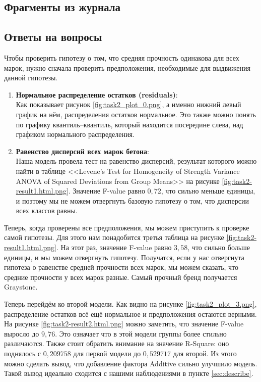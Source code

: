 \documentclass[12pt,a4paper]{article}
\begin{document}
  \subsection{Фрагменты из журнала}

  \subsection{Ответы на вопросы}
  \label{sec:model}
  Чтобы проверить гипотезу о том, что средняя прочность одинакова для всех марок, нужно сначала проверить предположения,
  необходимые для выдвижения данной гипотезы.
  \begin{enumerate}
    \item \textbf{Нормальное распределение остатков (residuals)}: \\
      Как показывает рисунок \ref{fig:task2_plot_0.png}, а именно нижний левый график на нём, распределения остатков нормальное.
      Это также можно понять по графику квантиль--квантиль, который находится посередине слева, над графиком нормального распределения.
    \item \textbf{Равенство дисперсий всех марок бетона}: \\
      Наша модель провела тест на равенство дисперсий, результат которого можно найти в таблице <<Levene's Test for Homogeneity of Strength Variance ANOVA of Squared Deviations from Group Means>> на рисунке \ref{fig:task2-result1.html.png}.
      Значение F-value равно $0,72$, что сильно меньше единицы, и поэтому мы не можем отвергнуть базовую гипотезу о том,
      что дисперсии всех классов равны.
  \end{enumerate}
  Теперь, когда проверены все предположения, мы можем приступить к проверке самой гипотезы.
  Для этого нам понадобится третья таблица на рисунке \ref{fig:task2-result1.html.png}.
  На этот раз, значение F-value равно $3,58$, что сильно больше единицы, и мы можем отвергнуть гипотезу.
  Получатся, если у нас отвергнута гипотеза о равенстве средней прочности всех марок,
  мы можем сказать, что средние прочности у всех марок разные.
  Самый прочный бренд получается Graystone.

  Теперь перейдём ко второй модели.
  Как видно на рисунке \ref{fig:task2_plot_3.png}, распределение остатков всё ещё нормальное и предположения остаются верными.
  На рисунке \ref{fig:task2-result2.html.png} можно заметить, что значение F-value выросло до $9,76$.
  Это означает что в этой модели группы более стильно различаются.
  Также стоит обратить внимание на значение R-Square: оно поднялось с $0,209758$ для первой модели до $0,529717$ для второй.
  Из этого можно сделать вывод, что добавление фактора Additive сильно улучшило модель.
  Такой вывод идеально сходится с нашими наблюдениями в пункте \ref{sec:describe}.
\end{document}
